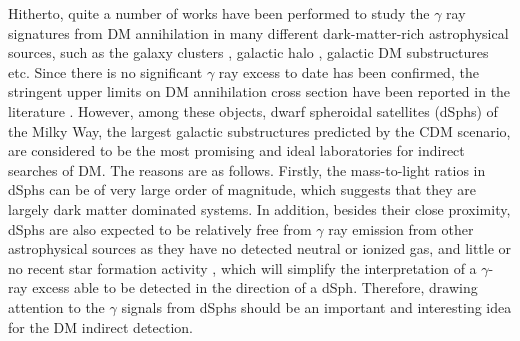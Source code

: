 \documentclass[12pt,prd,showpacs,amsmath,amssymb,aps,floats,floatfix,nofootinbib]{revtex4-1}
\def\GeV{\mathrm{GeV}} %
\def\MeV{\mathrm{MeV}} %
\begin{document}
Hitherto, quite a number of works have been performed to study the $\gamma$ ray signatures from DM annihilation in many different dark-matter-rich astrophysical sources, such as the galaxy clusters \cite{Ackermann:2010rg}, galactic halo \cite{Hooper:2011ti,Ackermann:2012rg,Abazajian:2012pn,Abdo:2010nc,Ackermann:2012qk,Weniger:2012tx,Ackermann:2013uma}, galactic DM substructures \cite{Zechlin:2011kk,Ackermann:2012nb,Zechlin:2012by} etc. Since there is no significant $\gamma$ ray excess to date has been confirmed, the stringent upper limits on DM annihilation cross section have been reported in the literature \cite{Abdo:2010ex,Ackermann:2011wa,GeringerSameth:2011iw,Cholis:2012am,GeringerSameth:2012sr,Mazziotta:2012ux,Baushev:2012ke,Huang:2012yf,Ackermann:2013yva,Ackermann:2015zua,Tsai:2012cs}.
However, among these objects, dwarf spheroidal satellites (dSphs) of the Milky Way, the largest galactic substructures predicted by the CDM scenario, are considered to be the most promising and ideal laboratories for indirect searches of DM. The reasons are as follows. Firstly, the mass-to-light ratios in dSphs can be of very large order of magnitude, which suggests that they are largely dark matter dominated systems. In addition, besides their close proximity, dSphs are also expected to be relatively free from  $\gamma$ ray emission from other astrophysical sources as they have no detected neutral or ionized gas, and little or no recent star formation activity \cite{Mateo:1998wg,Grcevich:2009gt}, which will simplify the interpretation of a $\gamma$-ray excess able to be detected in the direction of a dSph.
Therefore, drawing attention to the $\gamma$ signals from dSphs should be an important and interesting idea for the DM indirect detection.
\end{document}
